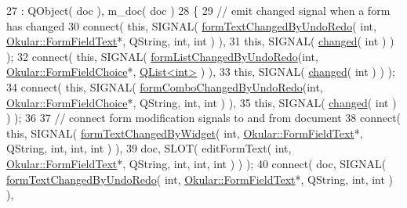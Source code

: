 \begin{DoxyCode}
27     : QObject( doc ), m\_doc( doc )
28 \{
29     \textcolor{comment}{// emit changed signal when a form has changed}
30     connect( \textcolor{keyword}{this}, SIGNAL( \hyperlink{classFormWidgetsController_a83510071c6ada2c746f4ef289577d6ef}{formTextChangedByUndoRedo}( \textcolor{keywordtype}{int}, 
      \hyperlink{classOkular_1_1FormFieldText}{Okular::FormFieldText}*, QString, \textcolor{keywordtype}{int}, \textcolor{keywordtype}{int} ) ),
31              \textcolor{keyword}{this}, SIGNAL( \hyperlink{classFormWidgetsController_a7a0301cbe80b6d18423794448df038b0}{changed}( \textcolor{keywordtype}{int} ) ) );
32     connect( \textcolor{keyword}{this}, SIGNAL( \hyperlink{classFormWidgetsController_a41ab728e4ee6afd79111f710eccbdb91}{formListChangedByUndoRedo}(\textcolor{keywordtype}{int}, 
      \hyperlink{classOkular_1_1FormFieldChoice}{Okular::FormFieldChoice}*, \hyperlink{classQList}{QList<int>} ) ),
33              \textcolor{keyword}{this}, SIGNAL( \hyperlink{classFormWidgetsController_a7a0301cbe80b6d18423794448df038b0}{changed}( \textcolor{keywordtype}{int} ) ) );
34     connect( \textcolor{keyword}{this}, SIGNAL( \hyperlink{classFormWidgetsController_a7a69cd267b127c5fd87319228205f77d}{formComboChangedByUndoRedo}(\textcolor{keywordtype}{int}, 
      \hyperlink{classOkular_1_1FormFieldChoice}{Okular::FormFieldChoice}*, QString, \textcolor{keywordtype}{int}, \textcolor{keywordtype}{int} ) ),
35              \textcolor{keyword}{this}, SIGNAL( \hyperlink{classFormWidgetsController_a7a0301cbe80b6d18423794448df038b0}{changed}( \textcolor{keywordtype}{int} ) ) );
36 
37     \textcolor{comment}{// connect form modification signals to and from document}
38     connect( \textcolor{keyword}{this}, SIGNAL( \hyperlink{classFormWidgetsController_afa83b700a3a1ff593dc63b085416ea20}{formTextChangedByWidget}( \textcolor{keywordtype}{int}, 
      \hyperlink{classOkular_1_1FormFieldText}{Okular::FormFieldText}*, QString, \textcolor{keywordtype}{int}, \textcolor{keywordtype}{int}, \textcolor{keywordtype}{int} ) ),
39              doc, SLOT( editFormText( \textcolor{keywordtype}{int}, \hyperlink{classOkular_1_1FormFieldText}{Okular::FormFieldText}*, QString, \textcolor{keywordtype}{int}, \textcolor{keywordtype}{int}, \textcolor{keywordtype}{
      int} ) ) );
40     connect( doc, SIGNAL( \hyperlink{classFormWidgetsController_a83510071c6ada2c746f4ef289577d6ef}{formTextChangedByUndoRedo}( \textcolor{keywordtype}{int}, 
      \hyperlink{classOkular_1_1FormFieldText}{Okular::FormFieldText}*, QString, \textcolor{keywordtype}{int}, \textcolor{keywordtype}{int} ) ),

\end{DoxyCode}
